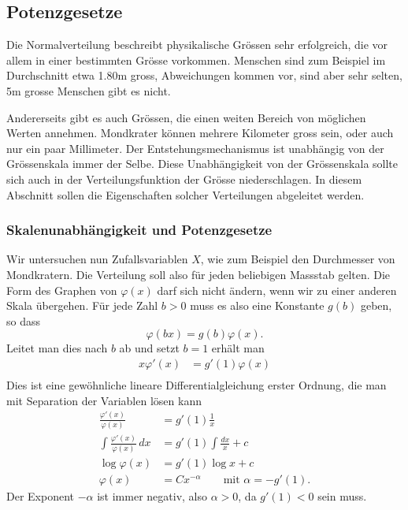 %
%
%
\subsection{Potenzgesetze} \label{potenzgesetze}
%
Die Normalverteilung beschreibt physikalische Grössen sehr erfolgreich,
die vor allem in einer bestimmten Grösse vorkommen.
Menschen sind zum
Beispiel im Durchschnitt etwa 1.80m gross, Abweichungen kommen vor, sind
aber sehr selten, 5m grosse Menschen gibt es nicht.


Andererseits gibt es auch Grössen, die einen weiten Bereich von möglichen
Werten annehmen.
Mondkrater können mehrere Kilometer gross sein, oder auch
nur ein paar Millimeter.
Der Entstehungsmechanismus ist unabhängig von der
Grössenskala immer der Selbe.
Diese Unabhängigkeit von der Grössenskala
sollte sich auch in der Verteilungsfunktion der Grösse niederschlagen.
In diesem Abschnitt sollen die Eigenschaften solcher Verteilungen abgeleitet
werden.

\subsubsection{Skalenunabhängigkeit und Potenzgesetze}
Wir untersuchen nun Zufallsvariablen $X$, wie zum Beispiel den Durchmesser
von Mondkratern. 
Die Verteilung soll also für jeden beliebigen
Mass\-stab gelten.
Die Form des Graphen von $\varphi(x)$ darf sich nicht ändern,
wenn wir zu einer anderen Skala übergehen.
Für jede Zahl $b>0$ muss es also eine Konstante $g(b)$ geben, 
so dass
\[
\varphi(bx)=g(b)\varphi(x).
\]
Leitet man dies nach $b$ ab und setzt $b=1$ erhält man
\begin{align*}
x\varphi'(x)&=g'(1)\varphi(x)\\
\end{align*}
Dies ist eine gewöhnliche lineare Differentialgleichung
erster Ordnung, die man mit Separation der Variablen
lösen kann
\begin{align*}
\frac{\varphi'(x)}{\varphi(x)}&=g'(1)\frac1x
\\
\int\frac{\varphi'(x)}{\varphi(x)}\,dx&=g'(1)\int\frac{dx}x + c
\\
\log \varphi(x)&=g'(1)\log x+c
\\
\varphi(x)&=Cx^{-\alpha}\qquad\text{mit $\alpha=-g'(1)$}.
\end{align*}
Der Exponent $-\alpha$ ist immer negativ, also $\alpha > 0$,
da $g'(1)<0$ sein muss.


